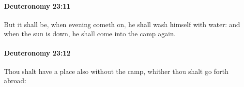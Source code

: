 		\paragraph{Deuteronomy 23:11} %
			\label{DEUTERONOMY-23-11}

			But it shall be, when evening cometh on, he shall wash himself with water: and when the sun is down, he shall come into the camp again.


		\paragraph{Deuteronomy 23:12} %
			\label{DEUTERONOMY-23-12}

			Thou shalt have a place also without the camp, whither thou shalt go forth abroad:


